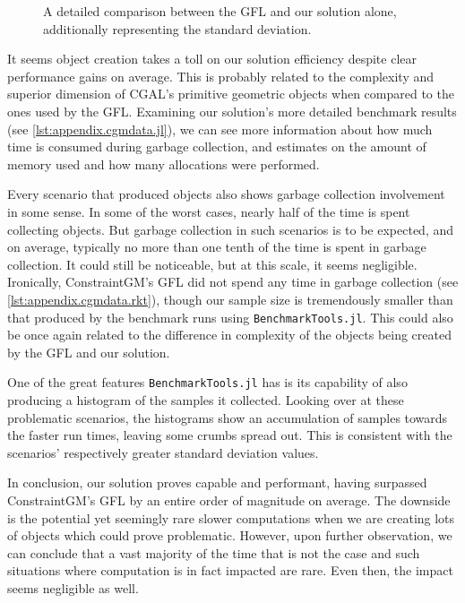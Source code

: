 \begin{figure}[htb]
  \centering
  \caption[GFL vs. Our solution]{\label{fig:eval.cgm.perferr}%
    A detailed comparison between the \ac{GFL} and our solution alone, 
    additionally representing the standard deviation.}
\end{figure}

It seems object creation takes a toll on our solution efficiency despite clear
performance gains on average.  This is probably related to the complexity and
superior dimension of \ac{CGAL}'s primitive geometric objects when compared to
the ones used by the \ac{GFL}.  Examining our solution's more detailed benchmark
results (see \cref{lst:appendix.cgmdata.jl}), we can see more information about
how much time is consumed during garbage collection, and estimates on the amount
of memory used and how many allocations were performed.

Every scenario that produced objects also shows garbage collection involvement
in some sense.  In some of the worst cases, nearly half of the time is spent
collecting objects.  But garbage collection in such scenarios is to be expected,
and on average, typically no more than one tenth of the time is spent in garbage
collection.  It could still be noticeable, but at this scale, it seems
negligible.  Ironically, ConstraintGM's \ac{GFL} did not spend any time in
garbage collection (see \cref{lst:appendix.cgmdata.rkt}), though our sample size
is tremendously smaller than that produced by the benchmark runs using
\texttt{BenchmarkTools.jl}.  This could also be once again related to the
difference in complexity of the objects being created by the \ac{GFL} and our
solution.

One of the great features \texttt{BenchmarkTools.jl} has is its capability of
also producing a histogram of the samples it collected.  Looking over at these
problematic scenarios, the histograms show an accumulation of samples towards
the faster run times, leaving some crumbs spread out.  This is consistent with
the scenarios' respectively greater standard deviation values.

In conclusion, our solution proves capable and performant, having surpassed
ConstraintGM's \ac{GFL} by an entire order of magnitude on average.  The
downside is the potential yet seemingly rare slower computations when we are
creating lots of objects which could prove problematic.  However, upon further
observation, we can conclude that a vast majority of the time that is not the
case and such situations where computation is in fact impacted are rare.  Even
then, the impact seems negligible as well.

